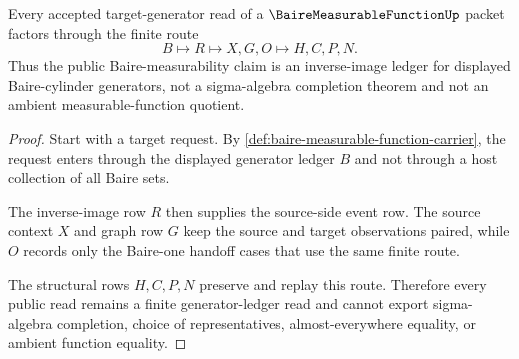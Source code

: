 \begin{theorem}
\label{thm:baire-measurable-function-generator-route}
Every accepted target-generator read of a $\BaireMeasurableFunctionUp$ packet factors through the finite route
$$
B \longmapsto R \longmapsto X,G,O \longmapsto H,C,P,N .
$$
Thus the public Baire-measurability claim is an inverse-image ledger for displayed Baire-cylinder generators, not a sigma-algebra completion theorem and not an ambient measurable-function quotient.
\end{theorem}
\begin{proof}
Start with a target request. By \autoref{def:baire-measurable-function-carrier}, the request enters through the displayed generator ledger $B$ and not through a host collection of all Baire sets.

The inverse-image row $R$ then supplies the source-side event row. The source context $X$ and graph row $G$ keep the source and target observations paired, while $O$ records only the Baire-one handoff cases that use the same finite route.

The structural rows $H,C,P,N$ preserve and replay this route. Therefore every public read remains a finite generator-ledger read and cannot export sigma-algebra completion, choice of representatives, almost-everywhere equality, or ambient function equality.
\end{proof}




